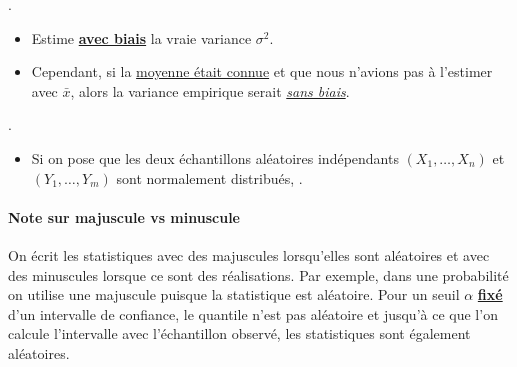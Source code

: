 \documentclass[10pt, french]{article}
\begin{document}
\begin{multicols*}{2}
\begin{definitionNOHFILLprop}
.

\begin{itemize}
	\item	Estime \underline{\textbf{avec biais}} la vraie variance $\sigma^{2}$.
	\item	Cependant, si la \underline{moyenne était connue} et que nous n'avions pas à l'estimer avec $\bar{x}$, alors la variance empirique serait \textit{\underline{sans biais}}.
\end{itemize}
\end{definitionNOHFILLprop}

\begin{definitionNOHFILLprop}[Statistique $F$]
.

\begin{itemize}
	\item	Si on pose que les deux échantillons aléatoires indépendants $(X_{1}, \dots, X_{n})$ et $(Y_{1}, \dots, Y_{m})$ sont normalement distribués, .
\end{itemize}
\end{definitionNOHFILLprop}

\paragraph{Note sur majuscule vs minuscule}	On écrit les statistiques avec des majuscules lorsqu'elles sont aléatoires et avec des minuscules lorsque ce sont des réalisations. Par exemple, dans une probabilité on utilise une majuscule puisque la statistique est aléatoire. 
Pour un seuil $\alpha$ \textbf{\underline{fixé}} d'un intervalle de confiance, le quantile n'est pas aléatoire et jusqu'à ce que l'on calcule l'intervalle avec l'échantillon observé, les statistiques sont également aléatoires. 





\end{multicols*}
\end{document}
